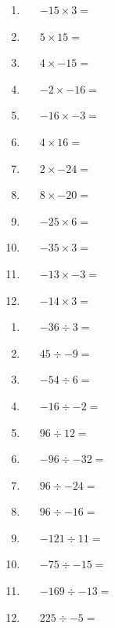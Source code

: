 \documentclass[a4paper,12pt]{article}
\begin{document}
\begin{tcolorbox}[colback=red!0!white, colframe=gray ,title=\subsubsection{Work out the following sums.}\label{multInt1}]
	\begin{multicols}{3}
		\begin{enumerate}[label=\footnotesize \roman*)]
			\item~~~$-15\times3=$
			\item~~~$5\times15=$
			\item~~~$4\times-15=$
			\item~~~$-2\times-16=$
			\item~~~$-16\times -3=$
			\item~~~$4\times16=$
			\item~~~$2\times-24=$
			\item~~~$8\times-20=$
			\item~~~$-25\times6=$
			\item~~~$-35\times3=$
			\item~~~$-13\times-3=$
			\item~~~$-14\times3=$
		\end{enumerate}
	\end{multicols}
\end{tcolorbox}\vspace{0.75cm}
\begin{tcolorbox}[colback=red!0!white, colframe=gray ,title=\subsubsection{Work out the following sums.}\label{multInt2}]
	\begin{multicols}{3}
		\begin{enumerate}[label=\footnotesize \roman*)]
			\item~~~$-36\div3=$
			\item~~~$45\div-9=$
			\item~~~$-54\div6=$
			\item~~~$-16\div-2=$
			\item~~~$96\div12=$
			\item~~~$-96\div-32=$
			\item~~~$96\div-24=$
			\item~~~$96\div-16=$
			\item~~~$-121\div11=$
			\item~~~$-75\div-15=$
			\item~~~$-169\div-13=$
			\item~~~$225\div-5=$
		\end{enumerate}
	\end{multicols}
\end{tcolorbox}\vspace{0.75cm}
\end{document}

